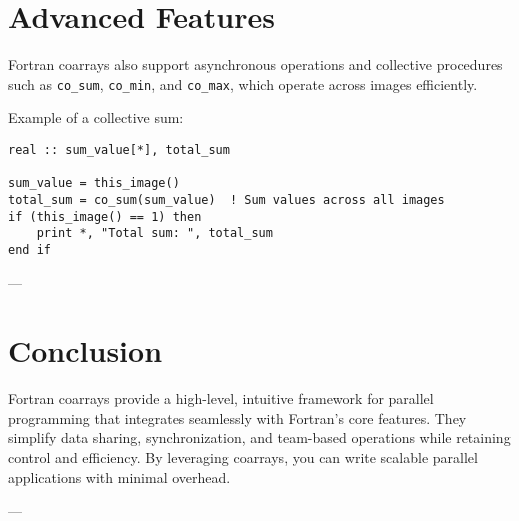 \section{Advanced Features}
Fortran coarrays also support asynchronous operations and collective procedures such as \texttt{co\_sum}, \texttt{co\_min}, and \texttt{co\_max}, which operate across images efficiently.

Example of a collective sum:
\begin{lstlisting}
real :: sum_value[*], total_sum

sum_value = this_image()
total_sum = co_sum(sum_value)  ! Sum values across all images
if (this_image() == 1) then
    print *, "Total sum: ", total_sum
end if
\end{lstlisting}

---

\section{Conclusion}
Fortran coarrays provide a high-level, intuitive framework for parallel programming that integrates seamlessly with Fortran’s core features. They simplify data sharing, synchronization, and team-based operations while retaining control and efficiency. By leveraging coarrays, you can write scalable parallel applications with minimal overhead.

---

\endinput  %

